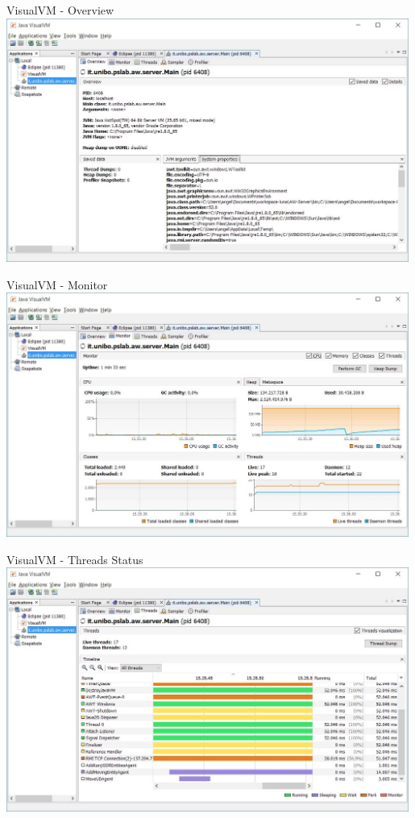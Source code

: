 \documentclass[presentation]{beamer}
\begin{document}
\begin{frame}{VisualVM - Overview}
\centering
\includegraphics[width=0.99\textwidth]{img/jvisualvm-0}
\end{frame}

\begin{frame}{VisualVM - Monitor}
\centering
\includegraphics[width=0.99\textwidth]{img/jvisualvm-1}
\end{frame}

\begin{frame}{VisualVM - Threads Status}
\centering
\includegraphics[width=0.99\textwidth]{img/jvisualvm-2}
\end{frame}
\end{document}
